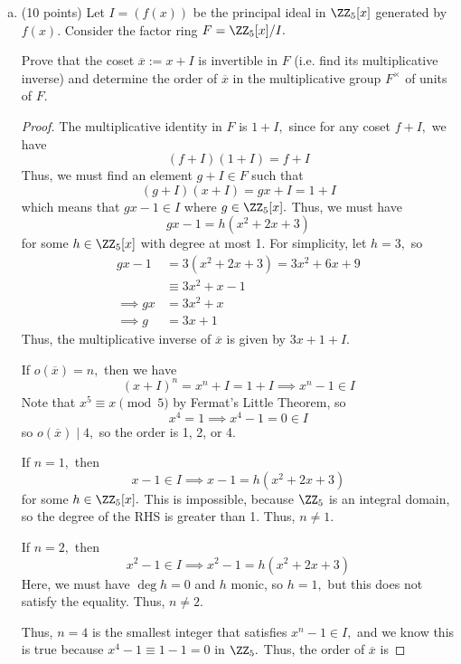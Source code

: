 \documentclass{article}
\begin{document}
\begin{itemize}
\begin{enumerate}[(a)]
			\item (10 points) Let $I=(f(x))$ be the principal ideal in $\ZZ_5[x]$ generated by $f(x).$ Consider the factor ring $F=\ZZ_5[x]/I.$

				Prove that the coset $\overline{x}:=x+I$ is invertible in $F$ (i.e. find its multiplicative inverse) and determine the order of $\overline{x}$ in the multiplicative group $F^\times$ of units of $F.$
				\begin{proof}
					The multiplicative identity in $F$ is $1+I,$ since for any coset $f+I,$ we have 
					\[(f+I)(1+I)=f+I\]
					Thus, we must find an element $g+I\in F$ such that
					\[(g+I)(x+I)=gx+I=1+I\]
					which means that $gx-1\in I$ where $g\in \ZZ_5[x].$ Thus, we must have 
					\[gx-1=h(x^2+2x+3)\]
					for some $h\in \ZZ_5[x]$ with degree at most 1. For simplicity, let $h=3,$ so
					\begin{align*}
						gx-1 &= 3(x^2+2x+3) = 3x^2+6x+9 \\
						&\equiv 3x^2+x-1 \\
						\implies gx &= 3x^2+x \\
						\implies g&= 3x+1
					\end{align*}
					Thus, the multiplicative inverse of $\overline x$ is given by $3x+1+I.$

					If $o(\overline x)=n,$ then we have
					\[(x+I)^n=x^n+I=1+I\implies x^n-1\in I\]
					Note that $x^5\equiv x\pmod 5$ by Fermat's Little Theorem, so
					\[x^4=1\implies x^4-1=0\in I\]
					so $o(\overline x)\mid 4,$ so the order is 1, 2, or 4. 

					If $n=1,$ then 
					\[x-1\in I\implies x-1=h(x^2+2x+3)\]
					for some $h\in \ZZ_5[x].$ This is impossible, because $\ZZ_5$ is an integral domain, so the degree of the RHS is greater than 1. Thus, $n\neq 1.$

					If $n=2,$ then
					\[x^2-1\in I\implies x^2-1=h(x^2+2x+3)\]
					Here, we must have $\deg h=0$ and $h$ monic, so $h=1,$ but this does not satisfy the equality. Thus, $n\neq 2.$

					Thus, $n=4$ is the smallest integer that satisfies $x^n-1\in I,$ and we know this is true because $x^4-1\equiv1-1=0$ in $\ZZ_5.$ Thus, the order of $\overline x$ is 
				\end{proof}


\end{enumerate}
\end{itemize}
\end{document}
